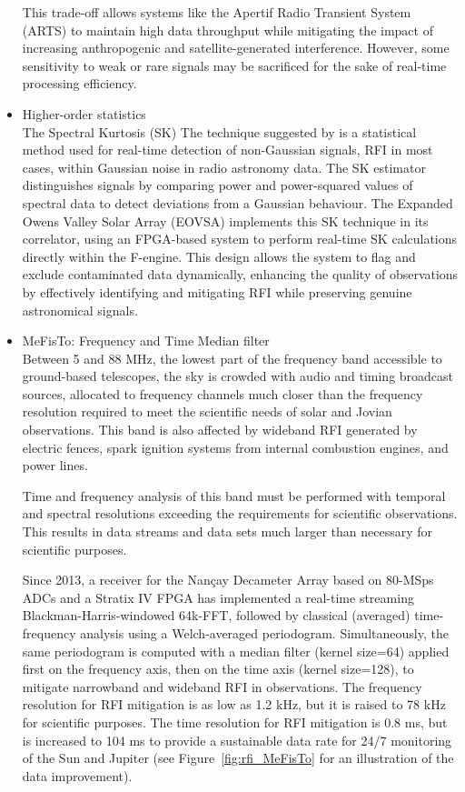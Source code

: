 \begin{itemize}
This trade-off allows systems like the Apertif Radio Transient System (ARTS) to maintain high data throughput while mitigating the impact of increasing anthropogenic and satellite-generated interference. However, some sensitivity to weak or rare signals may be sacrificed for the sake of real-time processing efficiency.
 
\item Higher-order statistics\\

The Spectral Kurtosis (SK) The technique suggested by \citep{nita2010statistics} is a statistical method used for real-time detection of non-Gaussian signals, RFI in most cases, within Gaussian noise in radio astronomy data. The SK estimator distinguishes signals by comparing power and power-squared values of spectral data to detect deviations from a Gaussian behaviour. The Expanded Owens Valley Solar Array (EOVSA) implements this SK technique in its correlator, using an FPGA-based system to perform real-time SK calculations directly within the F-engine. This design allows the system to flag and exclude contaminated data dynamically, enhancing the quality of observations by effectively identifying and mitigating RFI while preserving genuine astronomical signals.

\item MeFisTo: Frequency and Time Median filter\\

Between 5 and 88 MHz, the lowest part of the frequency band accessible to ground-based telescopes, the sky is crowded with audio and timing broadcast sources, allocated to frequency channels much closer than the frequency resolution required to meet the scientific needs of solar and Jovian observations. This band is also affected by wideband RFI generated by electric fences, spark ignition systems from internal combustion engines, and power lines.

Time and frequency analysis of this band must be performed with temporal and spectral resolutions exceeding the requirements for scientific observations. This results in data streams and data sets much larger than necessary for scientific purposes.

Since 2013, a receiver for the Nançay Decameter Array \citep{lecacheux2013, 2017pre8.conf..455L} based on 80-MSps ADCs and a Stratix IV FPGA has implemented a real-time streaming Blackman-Harris-windowed 64k-FFT, followed by classical (averaged) time-frequency analysis using a Welch-averaged periodogram. Simultaneously, the same periodogram is computed with a median filter (kernel size=64) applied first on the frequency axis, then on the time axis (kernel size=128), to mitigate narrowband and wideband RFI in observations. The frequency resolution for RFI mitigation is as low as 1.2 kHz, but it is raised to 78 kHz for scientific purposes. The time resolution for RFI mitigation is 0.8 ms, but is increased to 104 ms to provide a sustainable data rate for 24/7 monitoring of the Sun and Jupiter (see Figure~\ref{fig:rfi_MeFisTo} for an illustration of the data improvement).


\end{itemize}
